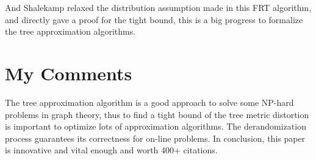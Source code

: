 \documentclass[11pt,twocolumn]{IEEEtran}
\begin{document}
And Shalekamp relaxed the distribution assumption made in this FRT algorithm, and directly gave a proof
for the tight bound, this is a big progress to formalize the tree approximation algorithms\cite{FRT}.

\section{My Comments}
The tree approximation algorithm is a good approach to solve some NP-hard problems in graph theory,
thus to find a tight bound of the tree metric distortion is important to optimize lots of approximation 
algorithms. The derandomization process guarantees its correctness for on-line problems. In conclusion,
this paper is innovative and vital enough and worth 400+ citations.


\end{document}
